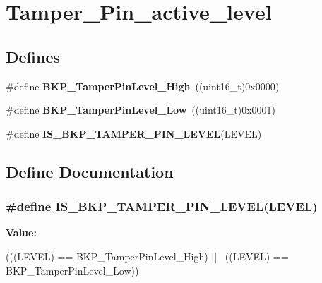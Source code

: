 \hypertarget{group__Tamper__Pin__active__level}{
\section{Tamper\_\-Pin\_\-active\_\-level}
\label{group__Tamper__Pin__active__level}
}
\subsection*{Defines}
\begin{DoxyCompactItemize}
\item 
\hypertarget{group__Tamper__Pin__active__level_gae7203c3c0202cd68d201278c8be2b967}{
\#define {\bfseries BKP\_\-TamperPinLevel\_\-High}~((uint16\_\-t)0x0000)}
\label{group__Tamper__Pin__active__level_gae7203c3c0202cd68d201278c8be2b967}

\item 
\hypertarget{group__Tamper__Pin__active__level_gade9fc51f494eddcc4d88679c80fe39ce}{
\#define {\bfseries BKP\_\-TamperPinLevel\_\-Low}~((uint16\_\-t)0x0001)}
\label{group__Tamper__Pin__active__level_gade9fc51f494eddcc4d88679c80fe39ce}

\item 
\#define {\bfseries IS\_\-BKP\_\-TAMPER\_\-PIN\_\-LEVEL}(LEVEL)
\end{DoxyCompactItemize}


\subsection{Define Documentation}
\hypertarget{group__Tamper__Pin__active__level_gae7cd3bd314605f7752062c814b850c23}{
\subsubsection[{IS\_\-BKP\_\-TAMPER\_\-PIN\_\-LEVEL}]{\setlength{\rightskip}{0pt plus 5cm}\#define IS\_\-BKP\_\-TAMPER\_\-PIN\_\-LEVEL(LEVEL)}}
\label{group__Tamper__Pin__active__level_gae7cd3bd314605f7752062c814b850c23}
{\bfseries Value:}
\begin{DoxyCode}
(((LEVEL) == BKP_TamperPinLevel_High) || \
                                        ((LEVEL) == BKP_TamperPinLevel_Low))
\end{DoxyCode}
